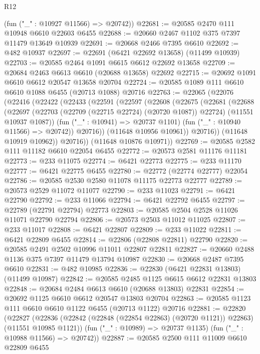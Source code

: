\begin{lexlean}{R12}
\begin{coremodule}
{{{{{{{{{{{{{{{{{{{{{{{{{{{{{{{{{{{{{{{{{{{{{{{{{{{{{{{{{{{{{{{{{{{{{{{{{{{{{{{{{{      (fun ("_" : @10927 @11566) => @20742))
@22681 := @20585 @2470 @111 @10948 @6610 @22603 @6455
@22688 := @20660 @2467 @1102 @375 @7397 @11479 @13649 @10939
@22691 := @20668 @2466 @7395 @6610
@22692 := @482 @10937
@22697 := @22691 (@6421 @22692 @13658) (@11499 @10939)
@22703 := @20585 @2464 @1091 @6615 @6612 @22692 @13658
@22709 := @20684 @2463 @6613 @6610 (@20688 @13658) @22692
@22715 := @20692 @1091 @6610 @6612 @20547 @13658 @20704
@22724 := @20585 @1089 @111 @6610 @6610 @1088 @6455 (@20713 @1088) @20716
@22763 := @22065
    (@22076
      (@22416
        (@22422
          (@22433
            (@22591
              (@22597
                (@22608
                  (@22675
                    (@22681
                      (@22688
                        (@22697
                          (@22703 (@22709 (@22715 @22724) (@20720 @1087)) @22724)
                          (@11551 @10937 @1087))
                        (fun ("_" : @10941) => @20737 @1101)
                        (fun ("_" : @10940 @11566) => @20742))
                      @20716))
                  (@11648 @10956 @10961))
                @20716))
            (@11648 @10919 @10962))
          @20716))
      (@11648 @10876 @10971))
@22769 := @20585 @2582 @111 @11182 @6610 @22054 @6455
@22772 := @20573 @2581 @11176 @11181
@22773 := @233 @11075
@22774 := @6421 @22773
@22775 := @233 @11170
@22777 := @6421 @22775 @6455
@22780 := @22772 (@22774 @22777) @22054
@22786 := @20585 @2530 @2580 @11078 @11175 @22773 @22777
@22789 := @20573 @2529 @11072 @11077
@22790 := @233 @11023
@22791 := @6421 @22790
@22792 := @233 @11066
@22794 := @6421 @22792 @6455
@22797 := @22789 (@22791 @22794) @22773
@22803 := @20585 @2504 @2528 @11026 @11071 @22790 @22794
@22806 := @20573 @2503 @11012 @11025
@22807 := @233 @11017
@22808 := @6421 @22807
@22809 := @233 @11022
@22811 := @6421 @22809 @6455
@22814 := @22806 (@22808 @22811) @22790
@22820 := @20585 @2491 @2502 @10996 @11011 @22807 @22811
@22827 := @20660 @2488 @1136 @375 @7397 @11479 @13794 @10987
@22830 := @20668 @2487 @7395 @6610
@22831 := @482 @10985
@22836 := @22830 (@6421 @22831 @13803) (@11499 @10987)
@22842 := @20585 @2485 @1125 @6615 @6612 @22831 @13803
@22848 := @20684 @2484 @6613 @6610 (@20688 @13803) @22831
@22854 := @20692 @1125 @6610 @6612 @20547 @13803 @20704
@22863 := @20585 @1123 @111 @6610 @6610 @1122 @6455 (@20713 @1122) @20716
@22881 := @22820
    (@22827
      (@22836 (@22842 (@22848 (@22854 @22863) (@20720 @1121)) @22863) (@11551 @10985 @1121))
      (fun ("_" : @10989) => @20737 @1135)
      (fun ("_" : @10988 @11566) => @20742))
@22887 := @20585 @2500 @111 @11009 @6610 @22809 @6455
}}}}}}}}}}}}}}}}}}}}}}}}}}}}}}}}}}}}}}}}}}}}}}}}}}}}}}}}}}}}}}}}}}}}}}}}}}}}}}}}}}
\end{coremodule}
\end{lexlean}
